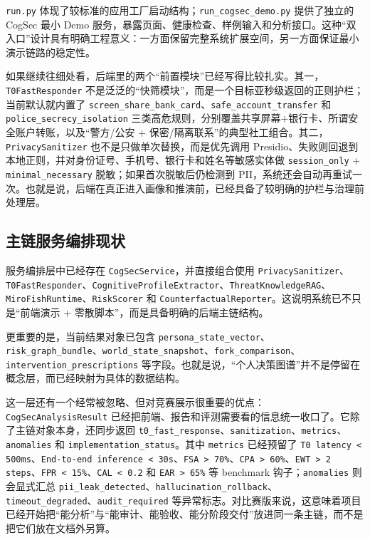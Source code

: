 \documentclass[12pt,a4paper]{ctexart}
\begin{document}
\texttt{run.py} 体现了较标准的应用工厂启动结构；\texttt{run\_cogsec\_demo.py} 提供了独立的 CogSec 最小 Demo 服务，暴露页面、健康检查、样例输入和分析接口。这种“双入口”设计具有明确工程意义：一方面保留完整系统扩展空间，另一方面保证最小演示链路的稳定性。

如果继续往细处看，后端里的两个“前置模块”已经写得比较扎实。其一，\texttt{T0FastResponder} 不是泛泛的“快筛模块”，而是一个目标亚秒级返回的正则护栏；当前默认就内置了 \texttt{screen\_share\_bank\_card}、\texttt{safe\_account\_transfer} 和 \texttt{police\_secrecy\_isolation} 三类高危规则，分别覆盖共享屏幕+银行卡、所谓安全账户转账，以及“警方/公安 + 保密/隔离联系”的典型社工组合。其二，\texttt{PrivacySanitizer} 也不是只做单次替换，而是优先调用 Presidio、失败则回退到本地正则，并对身份证号、手机号、银行卡和姓名等敏感实体做 \texttt{session\_only} + \texttt{minimal\_necessary} 脱敏；如果首次脱敏后仍检测到 PII，系统还会自动再重试一次。也就是说，后端在真正进入画像和推演前，已经具备了较明确的护栏与治理前处理层。

\subsection{主链服务编排现状}

服务编排层中已经存在 \texttt{CogSecService}，并直接组合使用 \texttt{PrivacySanitizer}、\texttt{T0FastResponder}、\texttt{CognitiveProfileExtractor}、\texttt{ThreatKnowledgeRAG}、\texttt{MiroFishRuntime}、\texttt{RiskScorer} 和 \texttt{CounterfactualReporter}。这说明系统已不只是“前端演示 + 零散脚本”，而是具备明确的后端主链结构。

更重要的是，当前结果对象已包含 \texttt{persona\_state\_vector}、\texttt{risk\_graph\_bundle}、\texttt{world\_state\_snapshot}、\texttt{fork\_comparison}、\texttt{intervention\_prescriptions} 等字段。也就是说，“个人决策图谱”并不是停留在概念层，而已经映射为具体的数据结构。

这一层还有一个经常被忽略、但对竞赛展示很重要的优点：\texttt{CogSecAnalysisResult} 已经把前端、报告和评测需要看的信息统一收口了。它除了主链对象本身，还同步返回 \texttt{t0\_fast\_response}、\texttt{sanitization}、\texttt{metrics}、\texttt{anomalies} 和 \texttt{implementation\_status}。其中 \texttt{metrics} 已经预留了 \texttt{T0 latency < 500ms}、\texttt{End-to-end inference < 30s}、\texttt{FSA > 70\%}、\texttt{CPA > 60\%}、\texttt{EWT > 2 steps}、\texttt{FPR < 15\%}、\texttt{CAL < 0.2} 和 \texttt{EAR > 65\%} 等 benchmark 钩子；\texttt{anomalies} 则会显式汇总 \texttt{pii\_leak\_detected}、\texttt{hallucination\_rollback}、\texttt{timeout\_degraded}、\texttt{audit\_required} 等异常标志。对比赛版来说，这意味着项目已经开始把“能分析”与“能审计、能验收、能分阶段交付”放进同一条主链，而不是把它们放在文档外另算。
\end{document}

